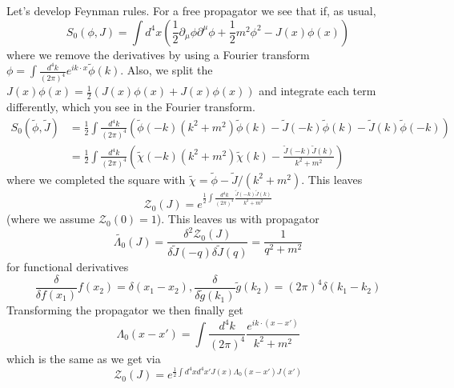 \documentclass{article}
\theoremstyle{definition}
\begin{document}
Let's develop Feynman rules. For a free propagator we see that if, as usual,
\begin{equation}
S_0(\phi, J) = \int d^4x \left( \frac{1}{2} \partial_\mu \phi \partial^\mu \phi
+ \frac{1}{2} m^2 \phi^2 - J(x) \phi(x) \right)
\end{equation}
where we remove the derivatives by using a Fourier transform $\phi = \int
\frac{d^4k}{(2\pi)^4} e^{ik \cdot x} \tilde{\phi}(k)$. Also, we split the $J(x)
\phi(x) = \frac{1}{2}(J(x) \phi(x) + J(x) \phi(x))$ and integrate each term
differently, which you see in the Fourier transform.
\begin{align*}
S_0(\tilde{\phi}, \tilde{J}) 
&= \frac{1}{2} \int \frac{d^4k}{(2\pi)^4} \left( \tilde{\phi}(-k) (k^2 + m^2) 
\tilde{\phi}(k) - \tilde{J}(-k) \tilde{\phi}(k) - \tilde{J}(k) \tilde{\phi}(-k)
 \right) \\
&= \frac{1}{2} \int \frac{d^4k}{(2\pi)^4} \left( \tilde{\chi}(-k) (k^2 + m^2)
\tilde{\chi}(k) - \frac{\tilde{J}(-k) \tilde{J}(k)}{k^2 + m^2} \right)
\end{align*}
where we completed the square with $\tilde{\chi} = \tilde{\phi} - \tilde{J} /
(k^2 + m^2)$. This leaves
\begin{equation}
  \mathcal{Z}_0(J) = e^{\frac{1}{2} \int \frac{d^4k}{(2\pi)^4}
    \frac{\tilde{J}(-k) \tilde{J}(k)}{k^2 + m^2}}
\end{equation}
(where we assume $\mathcal{Z}_0(0) = 1$). This leaves us with propagator
\begin{equation}
  \tilde{\Lambda_0}(J) = \frac{\delta^2 \mathcal{Z}_0(J)}
  {\delta \tilde{J}(-q) \delta \tilde{J}(q)} = \frac{1}{q^2 + m^2}
\end{equation}
for functional derivatives
\begin{equation}
  \frac{\delta}{\delta f(x_1)} f(x_2) = \delta(x_1 - x_2),
  \frac{\delta}{\delta \tilde{g}(k_1)} \tilde{g}(k_2) =
  (2\pi)^4 \delta(k_1 - k_2)
\end{equation}
Transforming the propagator we then finally get
\begin{equation}
  \Lambda_0(x - x') = \int \frac{d^4k}{(2\pi)^4}
  \frac{e^{ik \cdot (x - x')}}{k^2 + m^2}
\end{equation}
which is the same as we get via
\begin{equation}
  \mathcal{Z}_0(J) = e^{\frac{1}{2} \int d^4x d^4x' J(x) \Lambda_0(x - x') J(x')}
\end{equation}
\end{document}
